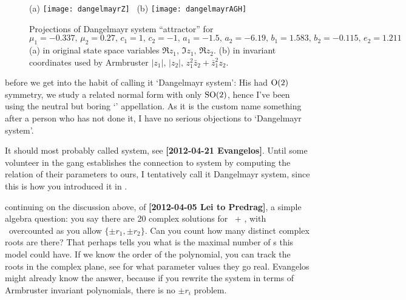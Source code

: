 \begin{description}
 \begin{figure}
\centering
 (a) \texttt{[image: dangelmayrZ]}~
 (b) \texttt{[image: dangelmayrAGH]}~
\caption{Projections of Dangelmayr system 
``attractor'' for $\mu_1 = -0.337,\, \mu_2 = 0.27,\, c_1 = 1,\, c_2 =
-1,\, a_1 = -1.5,\, a_2 = -6.19,\, b_1 = 1.583,\,  b_2 = -0.115,\, e_2 =
1.211$
(a) in original state space variables $\Re z_1,\,\Im z_1,\,\Re z_2$.
(b) in invariant coordinates used by
Armbruster \etal{} $|z_1|,\, |z_2|,\, z_1^2 \bar{z}_2 + \bar{z}_1^2 z_2$.
}
 \label{fig:dangelmayrChaos}
\end{figure}

\item[2012-04-05 Predrag to {\twoMode} gang] before we get into the habit of
calling it `Dangelmayr system': His had $\textrm{O}(2)$ symmetry, we study a
related normal form with only  $\textrm{SO}(2)$, hence I've been using the
neutral but boring `{\twoMode}' appellation. As it is the custom name
something after a person who has not done it, I have no serious
objections to `Dangelmayr system'.

\item[2012-04-25 Evangelos to Predrag] It should most probably called
{\twoMode} system, see {\bf [2012-04-21 Evangelos]}. Until some
volunteer in the gang establishes the connection to {\twoMode}
system by computing the relation of their parameters to ours, I
tentatively call it Dangelmayr system, since this is how you introduced
it in .

\item[2012-04-25 Predrag to {\twoMode} gang] continuing on the discussion
above, of {\bf [2012-04-05 Lei to Predrag]}, a simple algebra question:
you say there are 20 complex solutions for \eqva\ + \reqva, with \reqva\
overcounted as you allow $\{\pm r_1, \pm r_2\}$. Can you count how many
distinct complex roots are there? That perhaps tells you what is the maximal
number of \template s this model could have. If we know the order of the
polynomial, you can track the roots in the complex plane, see for what
parameter values they go real. Evangelos might already know the answer,
because if you rewrite the {\twoMode} system in terms of Armbruster invariant
polynomials, there is no $\pm r_i$ problem.


\end{description}
